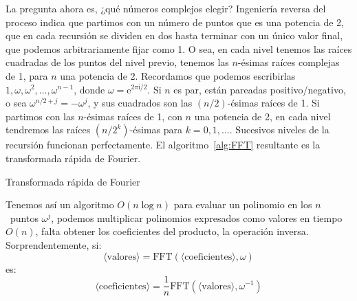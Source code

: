   La pregunta ahora es,
  ¿qué números complejos elegir?
  Ingeniería reversa del proceso
  indica que partimos con un número de puntos que es una potencia de \num{2},
  que en cada recursión se dividen en dos
  hasta terminar con un único valor final,
  que podemos arbitrariamente fijar como \num{1}.
  O sea,
  en cada nivel tenemos las raíces cuadradas de los puntos del nivel previo,
  tenemos las \(n\)\nobreakdash-ésimas raíces complejas de \num{1},
  para \(n\) una potencia de \num{2}.
  Recordamos que podemos escribirlas
  \(1, \omega, \omega^2, \dotsc, \omega^{n - 1}\),
  donde \(\omega = \mathrm{e}^{2 \pi \mathrm{i} / 2}\).
  Si \(n\) es par,
  están pareadas positivo/negativo,
  o sea \(\omega^{n/2 + j} = - \omega^j\),
  y sus cuadrados son las \((n/2)\)\nobreakdash-ésimas raíces de \num{1}.
  Si partimos con las \(n\)\nobreakdash-ésimas raíces de \num{1},
  con \(n\) una potencia de \num{2},
  en cada nivel tendremos las raíces \((n / 2^k)\)\nobreakdash-ésimas
  para \(k = 0, 1, \dotsc\).
  Sucesivos niveles de la recursión funcionan perfectamente.
  El algoritmo~\ref{alg:FFT} resultante es la transformada rápida de Fourier.
  \begin{algorithm}[ht]
    \DontPrintSemicolon\Indp

    \caption{Transformada rápida de Fourier}
    \label{alg:FFT}
  \end{algorithm}
  Tenemos así un algoritmo \(O(n \log n)\)
  para evaluar un polinomio en los \(n\)~puntos \(\omega^j\),
  podemos multiplicar polinomios expresados como valores en tiempo \(O(n)\),
  falta obtener los coeficientes del producto,
  la operación inversa.
  Sorprendentemente,
  si:
  \begin{equation*}
    \langle \mathrm{valores} \rangle
      = \mathrm{FFT}(\langle \mathrm{coeficientes} \rangle, \omega)
  \end{equation*}
  es:
  \begin{equation*}
    \langle \mathrm{coeficientes} \rangle
      = \frac{1}{n}
          \mathrm{FFT}(\langle \mathrm{valores} \rangle, \omega^{-1})
  \end{equation*}
